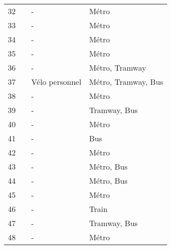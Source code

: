 \begin{longtable}{p{0.5cm}p{5.5cm}p{3cm}p{4cm}}
    \small{32} & \small{\textcite{ma_estimating_2019}}\index{Ma, Ting|pagebf} & \small{-} & \small{Métro}\\
    \small{33} & \small{\textcite{ma_bicycle_2015}}\index{Ma, Ting|pagebf} & \small{-} & \small{Métro}\\
    \small{34} & \small{\textcite{ma_understanding_2018}}\index{Ma, Xinwei|pagebf} & \small{-} & \small{Métro}\\
    \small{35} & \small{\textcite{ma_measuring_2018}}\index{Ma, Xinwei|pagebf} & \small{-} & \small{Métro}\\
    \small{36} & \small{\textcite{martin_evaluating_2014}}\index{Martin, Elliot W.|pagebf} & \small{-} & \small{Métro, Tramway}\\
    \small{37} & \small{\textcite{montes_shared_2023}}\index{Montes, Alejandro|pagebf} & \small{Vélo personnel} & \small{Métro, Tramway, Bus}\\
    \small{38} & \small{\textcite{nam_designing_2018}}\index{Nam, Daisik|pagebf}\index{Nam, Daisik|pagebf} & \small{-} & \small{Métro}\\
    \small{39} & \small{\textcite{radzimski_exploring_2021}}\index{Radzimski, Adam|pagebf} & \small{-} & \small{Tramway, Bus}\\
    \small{40} & \small{\textcite{romm_differences_2022}}\index{Romm, Daniel|pagebf} & \small{-} & \small{Métro}\\
    \small{41} & \small{\textcite{shah_b-t_2016}}\index{Shah, Neelkumar|pagebf} & \small{-} & \small{Bus}\\
    \small{42} & \small{\textcite{song_investigating_2020}}\index{Song, Ying|pagebf} & \small{-} & \small{Métro}\\
    \small{43} & \small{\textcite{tamakloe_determinants_2021}}\index{Tamakloe, Reuben|pagebf} & \small{-} & \small{Métro, Bus}\\
    \small{44} & \small{\textcite{tang_uncovering_2021}}\index{Tang, Jinjun|pagebf} & \small{-} & \small{Métro, Bus}\\
    \small{45} & \small{\textcite{tarpin-pitre_typology_2020}}\index{Tarpin-Pitre, Léandre|pagebf} & \small{-} & \small{Métro}\\
    \small{46} & \small{\textcite{tomita_demand_2017}}\index{Tomita, Yasuo|pagebf}\index{Tomita, Yasuo|pagebf} & \small{-} & \small{Train}\\
    \small{47} & \small{\textcite{kuijk_preferences_2022}}\index{van Kuijk, R.J.|pagebf} & \small{-} & \small{Tramway, Bus}\\
    \small{48} & \small{\textcite{wu_identification_2023}}\index{Wu, Hao|pagebf}\index{Wu, Hao|pagebf} & \small{-} & \small{Métro}\\

\end{longtable}
